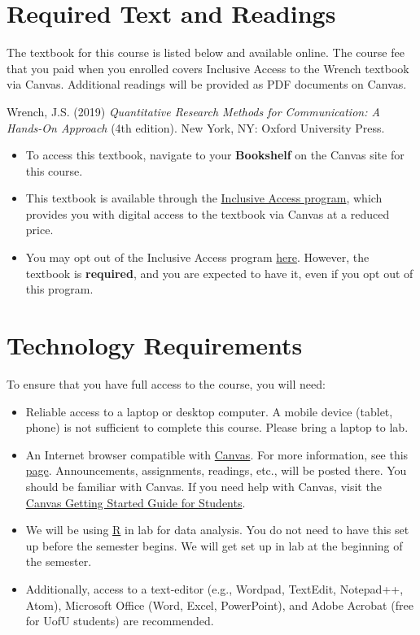 \documentclass[
  letterpaper,
]{article}
\providecommand{\tightlist}{%
  \setlength{\itemsep}{0pt}\setlength{\parskip}{0pt}}\usepackage{longtable,booktabs,array}
\begin{document}
\section{Required Text and Readings}\label{sec-text}

The textbook for this course is listed below and available online. The
course fee that you paid when you enrolled covers Inclusive Access to
the Wrench textbook via Canvas. Additional readings will be provided as
PDF documents on Canvas.

Wrench, J.S. (2019) \emph{Quantitative Research Methods for
Communication: A Hands-On Approach} (4th edition). New York, NY: Oxford
University Press.

\begin{itemize}
\tightlist
\item
  To access this textbook, navigate to your \textbf{Bookshelf} on the
  Canvas site for this course.
\item
  This textbook is available through the
  \href{https://www.campusstore.utah.edu/inclusiveaccess/}{Inclusive
  Access program}, which provides you with digital access to the
  textbook via Canvas at a reduced price.
\item
  You may opt out of the Inclusive Access program
  \href{https://www.campusstore.utah.edu/inclusiveaccess/}{here}.
  However, the textbook is \textbf{required}, and you are expected to
  have it, even if you opt out of this program.
\end{itemize}

\section{Technology Requirements}\label{sec-tech}

To ensure that you have full access to the course, you will need:

\begin{itemize}
\item
  Reliable access to a laptop or desktop computer. A mobile device
  (tablet, phone) is not sufficient to complete this course. Please
  bring a laptop to lab.
\item
  An Internet browser compatible with
  \href{https://utah.instructure.com/}{Canvas}. For more information,
  see this
  \href{https://community.canvaslms.com/docs/DOC-10720-67952720329}{page}.
  Announcements, assignments, readings, etc., will be posted there. You
  should be familiar with Canvas. If you need help with Canvas, visit
  the \href{https://community.canvaslms.com/docs/DOC-10701}{Canvas
  Getting Started Guide for Students}.
\item
  We will be using \href{https://www.r-project.org/}{R} in lab for data
  analysis. You do not need to have this set up before the semester
  begins. We will get set up in lab at the beginning of the semester.
\item
  Additionally, access to a text-editor (e.g., Wordpad, TextEdit,
  Notepad++, Atom), Microsoft Office (Word, Excel, PowerPoint), and
  Adobe Acrobat (free for UofU students) are recommended.
\end{itemize}
\end{document}
